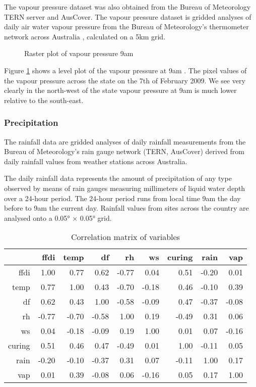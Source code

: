 \documentclass{article}
\begin{document}
The vapour pressure dataset was also obtained from the Bureau of Meteorology TERN server and AusCover. The vapour pressure dataset is gridded analyses of daily air water vapour pressure from the Bureau of Meteorology's thermometer network across Australia \citep{jones09}, calculated on a 5km grid. 

\begin{figure}[h]
	\centering 
	\caption{Raster plot of vapour pressure 9am } 
	\label{fig:vap_ras} 
\end{figure}

Figure \ref{fig:vap_ras} shows a level plot of the vapour pressure at 9am \citep{rastervis}. The pixel values of the vapour pressure across the state on the 7th of February 2009. We see very clearly in the north-west of the state vapour pressure at 9am is much lower relative to the south-east. 


\subsubsection{Precipitation}

The rainfall data are gridded analyses of daily rainfall measurements from the Bureau of Meteorology's rain gauge network (TERN, AusCover) derived from daily rainfall values from weather stations across Australia. 

The daily rainfall data represents the amount of precipitation of any type observed by means of rain gauges measuring millimeters of liquid water depth over a 24-hour period. The 24-hour period runs from local time 9am the day before to 9am the current day. Rainfall values from sites across the country are analysed onto a 0.05° × 0.05° grid.

\begin{table}[ht]
	\centering
	\begin{tabular}{rrrrrrrrr}
		\hline
		& ffdi & temp & df & rh & ws & curing & rain & vap \\ 
		\hline
		ffdi & 1.00 & 0.77 & 0.62 & -0.77 & 0.04 & 0.51 & -0.20 & 0.01 \\ 
		temp & 0.77 & 1.00 & 0.43 & -0.70 & -0.18 & 0.46 & -0.10 & 0.39 \\ 
		df & 0.62 & 0.43 & 1.00 & -0.58 & -0.09 & 0.47 & -0.37 & -0.08 \\ 
		rh & -0.77 & -0.70 & -0.58 & 1.00 & 0.19 & -0.49 & 0.31 & 0.06 \\ 
		ws & 0.04 & -0.18 & -0.09 & 0.19 & 1.00 & 0.01 & 0.07 & -0.16 \\ 
		curing & 0.51 & 0.46 & 0.47 & -0.49 & 0.01 & 1.00 & -0.11 & 0.05 \\ 
		rain & -0.20 & -0.10 & -0.37 & 0.31 & 0.07 & -0.11 & 1.00 & 0.17 \\ 
		vap & 0.01 & 0.39 & -0.08 & 0.06 & -0.16 & 0.05 & 0.17 & 1.00 \\ 
		\hline
	\end{tabular}
	\caption{Correlation matrix of variables}
	\label{table:correl}
\end{table}
\end{document}
